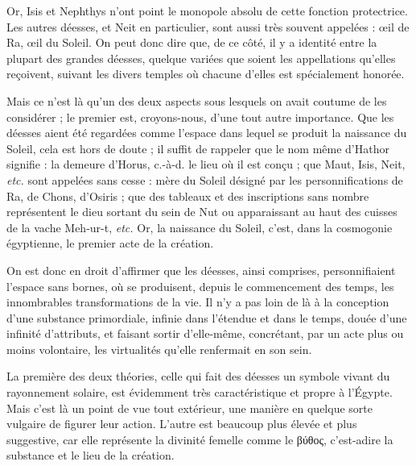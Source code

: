 \documentclass[letterpaper,twocolumn,openany,nodeprecatedcode]{dndbook}
\newcommand*\hieroAARM{}
\begin{document}
Or, Isis et Nephthys n'ont point le monopole absolu de cette fonction protectrice. Les autres déesses, et Neit en particulier, sont aussi très souvent appelées : œil de Ra, œil du Soleil. On peut donc dire que, de ce côté, il y a identité entre la plupart des grandes déesses, quelque variées que soient les appellations qu'elles reçoivent, suivant les divers temples où chacune d'elles est spécialement honorée.

Mais ce n'est là qu'un des deux aspects sous lesquels on avait coutume de les considérer ; le premier est, croyons-nous, d'une tout autre importance. Que les déesses aient été regardées comme l'espace dans lequel se produit la naissance du Soleil, cela est hors de doute ; il suffit de rappeler que le nom même d'Hathor $\hieroAARM$ signifie : la demeure d'Horus, c.-à-d. le lieu où il est conçu ; que Maut, Isis, Neit, \emph{etc.} sont appelées sans cesse : mère du Soleil désigné par les personnifications de Ra, de Chons, d'Osiris ; que des tableaux et des inscriptions sans nombre représentent le dieu sortant du sein de Nut ou apparaissant au haut des cuisses de la vache Meh-ur-t, \emph{etc.} Or, la naissance du Soleil, c'est, dans la cosmogonie égyptienne, le premier acte de la création.

On est donc en droit d'affirmer que les déesses, ainsi comprises, personnifiaient l'espace sans bornes, où se produisent, depuis le commencement des temps, les innombrables transformations de la vie. Il n'y a pas loin de là à la conception d'une substance primordiale, infinie dans l'étendue et dans le temps, douée d'une infinité d'attributs, et faisant sortir d'elle-même, concrétant, par un acte plus ou moins volontaire, les virtualités qu'elle renfermait en son sein.

La première des deux théories, celle qui fait des déesses un symbole vivant du rayonnement solaire, est évidemment très caractéristique et propre à l'Égypte. Mais c'est là un point de vue tout extérieur, une manière en quelque sorte vulgaire de figurer leur action. L'autre est beaucoup plus élevée et plus suggestive, car elle représente la divinité femelle comme le βύθος, c'est-adire la substance et le lieu de la création.
\end{document}
